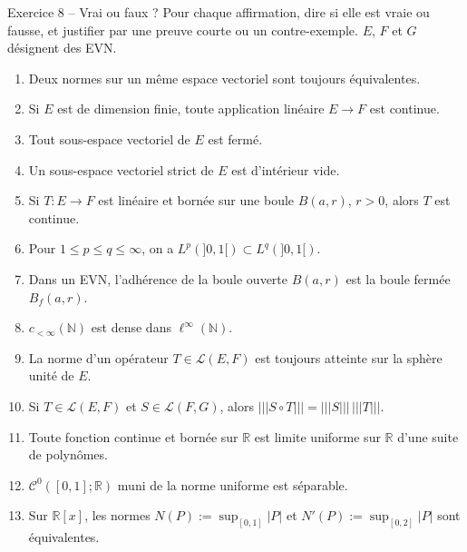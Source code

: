 \documentclass[11pt,a4paper]{article}
\newcommand{\R}{\mathbb{R}}
\newcommand{\N}{\mathbb{N}}
\newcommand{\Bf}{B_f}
\newcommand{\opnorm}[1]{|\!|\!|#1|\!|\!|}
\newcommand{\Lc}{\mathcal{L}}
\newcommand{\Cz}{\mathcal{C}^0}
\theoremstyle{definition}
\begin{document}
\begin{exo}{Exercice 8 -- Vrai ou faux ?}
Pour chaque affirmation, dire si elle est vraie ou fausse, et justifier par une preuve courte ou un contre-exemple. $E$, $F$ et $G$ désignent des EVN.
\begin{enumerate}[label=\arabic*.]
  \item Deux normes sur un même espace vectoriel sont toujours équivalentes.
  \item Si $E$ est de dimension finie, toute application linéaire $E\to F$ est continue.
  \item Tout sous-espace vectoriel de $E$ est fermé.
  \item Un sous-espace vectoriel strict de $E$ est d'intérieur vide.
  \item Si $T:E\to F$ est linéaire et bornée sur une boule $B(a,r)$, $r>0$, alors $T$ est continue.
  \item Pour $1\le p\le q\le\infty$, on a $L^p(]0,1[)\subset L^q(]0,1[)$.
  \item Dans un EVN, l'adhérence de la boule ouverte $B(a,r)$ est la boule fermée $\Bf(a,r)$.
  \item $c_{<\infty}(\N)$ est dense dans $\ell^\infty(\N)$.
  \item La norme d'un opérateur $T\in\Lc(E,F)$ est toujours atteinte sur la sphère unité de $E$.
  \item Si $T\in\Lc(E,F)$ et $S\in\Lc(F,G)$, alors $\opnorm{S\circ T}=\opnorm S\,\opnorm T$.
  \item Toute fonction continue et bornée sur $\R$ est limite uniforme sur $\R$ d'une suite de polynômes.
  \item $\Cz([0,1];\R)$ muni de la norme uniforme est séparable.
  \item Sur $\R[x]$, les normes $N(P):=\sup_{[0,1]}|P|$ et $N'(P):=\sup_{[0,2]}|P|$ sont équivalentes.
\end{enumerate}
\end{exo}
\end{document}
